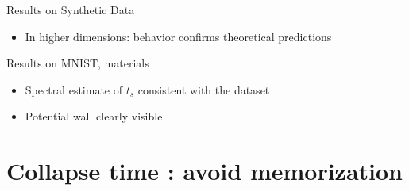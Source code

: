 \documentclass[aspectratio=169]{beamer}
\begin{document}
\begin{frame}{Results on Synthetic Data}
    \begin{itemize}
        \item In higher dimensions: behavior confirms theoretical predictions
    \end{itemize}
    
    \begin{center}
    \end{center}
\end{frame}


\begin{frame}{Results on MNIST, materials}
    \begin{itemize}
        \item Spectral estimate of $t_s$ consistent with the dataset
        \item Potential wall clearly visible
    \end{itemize}

    
    
    \begin{center}
    \end{center}
\end{frame}















\section{Collapse time : avoid memorization}
\end{document}
